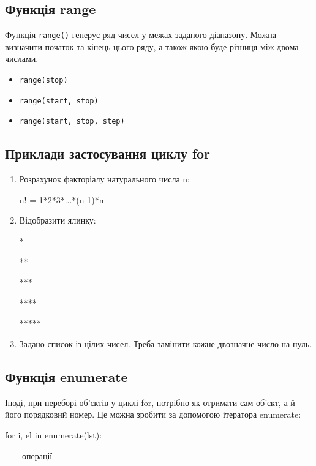  \subsection{Функція range} 
\begin{frame}
Функція \texttt{range()} генерує ряд чисел у межах заданого діапазону. Можна визначити початок та кінець цього ряду, а також якою буде різниця між двома числами.

\begin{itemize}
  \item \texttt{range(stop)}
  \item \texttt{range(start, stop)}
  \item \texttt{range(start, stop, step)}
\end{itemize}
\end{frame}

\subsection{Приклади застосування циклу for} 
\begin{frame}
\begin{enumerate}
  \item 
  Розрахунок факторіалу натурального числа n:

\begin{center}
n! = 1*2*3*...*(n-1)*n
\end{center}
\item 
Відобразити ялинку:

*

**

***

****

*****

\item 
Задано список із цілих чисел. Треба замінити кожне двозначне число на нуль.
\end{enumerate}
\end{frame}

\subsection{Функція enumerate}
\begin{frame}
Іноді, при переборі об'єктів у циклі for, потрібно як отримати сам об'єкт, а й його порядковий номер. Це можна зробити за допомогою ітератора enumerate:

\huge{for i, el in enumerate(lst):

~~~~операції}
\end{frame}

